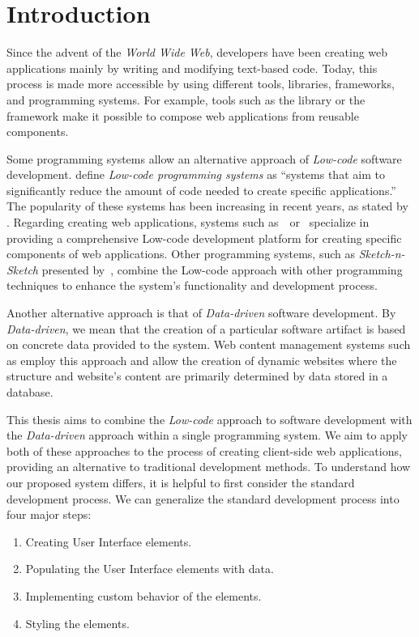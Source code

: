 \chapter*{Introduction}

Since the advent of the \emph{World Wide Web}, developers have been creating web applications mainly by writing and modifying text-based code.
Today, this process is made more accessible by using different tools, libraries, frameworks, and programming systems.
For example, tools such as the \citet{react} library or the \citet{vuejs} framework make it possible to compose web applications from reusable components.

Some programming systems allow an alternative approach of \emph{Low-code} software development.
\citet{Pinho_Aguiar_Amaral_2023} define \emph{Low-code programming systems} as ``systems that aim to significantly reduce the amount of code needed to create specific applications.''
The popularity of these systems has been increasing in recent years, as stated by \citet{Sahay_Indamutsa_Di}.
Regarding creating web applications, systems such as~\citet{mendix}~or~\citet{darklang} specialize in providing a comprehensive Low-code development platform for creating specific components of web applications.
Other programming systems, such as \emph{Sketch-n-Sketch} presented by~\citet{sketch-and-sketch}, combine the Low-code approach
with other programming techniques to enhance the system's functionality and development process.

Another alternative approach is that of \emph{Data-driven} software development.
By \emph{Data-driven}, we mean that the creation of a particular software artifact is based on concrete data provided to the system.
Web content management systems such as \citet{wordpress} employ this approach and allow the creation of dynamic websites where the structure and
website's content are primarily determined by data stored in a database.

This thesis aims to combine the \emph{Low-code} approach to software development with the \emph{Data-driven} approach within a single programming system.
We aim to apply both of these approaches to the process of creating client-side web applications, providing an alternative to traditional development methods.
To understand how our proposed system differs, it is helpful to first consider the standard development process.
We can generalize the standard development process into four major steps:
\begin{enumerate}
	\item Creating User Interface elements.
	\item Populating the User Interface elements with data.
	\item Implementing custom behavior of the elements.
	\item Styling the elements.
\end{enumerate}

